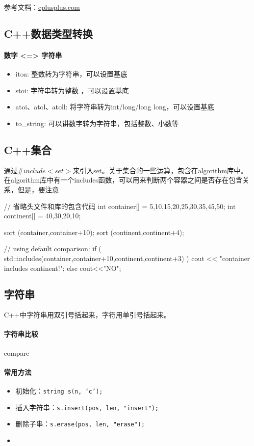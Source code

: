 参考文档：\href{https://www.cplusplus.com/}{cplusplus.com}
\subsection{C++数据类型转换}
\paragraph{数字 <=> 字符串}
\begin{itemize}
	\item itoa: 整数转为字符串，可以设置基底
	\item stoi: 字符串转为整数 ，可以设置基底
	\item atoi、atol、atoll: 将字符串转为int/long/long long，可以设置基底
	\item to\_string: 可以讲数字转为字符串，包括整数、小数等
\end{itemize}

\subsection{C++集合} 通过$\#include<set>$来引入set。关于集合的一些运算，包含在algorithm库中。在algorithm库中有一个includes函数，可以用来判断两个容器之间是否存在包含关系，但是，要注意
\begin{cpp}
	// 省略头文件和库的包含代码
	int container[] = {5,10,15,20,25,30,35,45,50};
	int continent[] = {40,30,20,10};
	
	sort (container,container+10);
	sort (continent,continent+4);
	
	// using default comparison:
	if ( std::includes(container,container+10,continent,continent+3) )
		cout << "container includes continent!\n";
	else	cout<<"NO\n";
	
\end{cpp}


\subsection{字符串}
C++中字符串用双引号括起来，字符用单引号括起来。
\paragraph{字符串比较}
compare

\paragraph{常用方法}
\begin{itemize}
	\item 初始化：\texttt{string s(n, 'c');}
	\item 插入字符串：\texttt{s.insert(pos, len, "insert");}
	\item 删除子串：\texttt{s.erase(pos, len, "erase");}
	\item 
\end{itemize}

